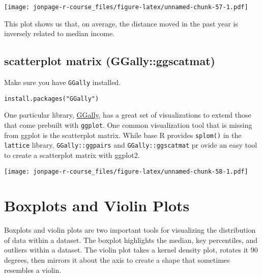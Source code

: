 \documentclass[]{book}
\newenvironment{Shaded}{\begin{snugshade}}{\end{snugshade}}
\newcommand{\KeywordTok}[1]{\textcolor[rgb]{0.13,0.29,0.53}{\textbf{{#1}}}}
\newcommand{\DataTypeTok}[1]{\textcolor[rgb]{0.13,0.29,0.53}{{#1}}}
\newcommand{\DecValTok}[1]{\textcolor[rgb]{0.00,0.00,0.81}{{#1}}}
\newcommand{\FloatTok}[1]{\textcolor[rgb]{0.00,0.00,0.81}{{#1}}}
\newcommand{\StringTok}[1]{\textcolor[rgb]{0.31,0.60,0.02}{{#1}}}
\newcommand{\NormalTok}[1]{{#1}}
\theoremstyle{definition}
\theoremstyle{definition}
\theoremstyle{remark}
\begin{document}
\texttt{[image: jonpage-r-course\_files/figure-latex/unnamed-chunk-57-1.pdf]}

This plot shows us that, on average, the distance moved in the past year
is inversely related to median income.

\section{scatterplot matrix
(GGally::ggscatmat)}\label{scatterplot-matrix-ggallyggscatmat}

Make sure you have \texttt{GGally} installed.

\begin{verbatim}
install.packages("GGally")
\end{verbatim}

One particular library, \href{http://ggobi.github.io/ggally/}{GGally},
has a great set of visualizations to extend those that come prebuilt
with \texttt{ggplot}. One common visualization tool that is missing from
ggplot is the scatterplot matrix. While base R provides \texttt{splom()}
in the \texttt{lattice} library, \texttt{GGally::ggpairs} and
\texttt{GGally::ggscatmat} pr ovide an easy tool to create a scatterplot
matrix with ggplot2.

\begin{Shaded}
\end{Shaded}

\texttt{[image: jonpage-r-course\_files/figure-latex/unnamed-chunk-58-1.pdf]}

\hypertarget{boxplots-and-violins}{\chapter{Boxplots and Violin
Plots}\label{boxplots-and-violins}}

Boxplots and violin plots are two important tools for visualizing the
distribution of data within a dataset. The boxplot highlights the
median, key percentiles, and outliers within a dataset. The violin plot
takes a kernel density plot, rotates it 90 degrees, then mirrors it
about the axis to create a shape that sometimes resembles a violin.
\end{document}

